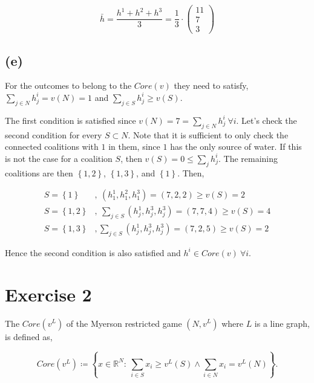\documentclass[american]{scrartcl}
\newcommand{\set}[1]{\left\{#1\right\}}
\newcommand{\Real}{\mathbb{R}}
\begin{document}
\begin{equation}
    \bar{h} = \frac{h^1 + h^2 + h^3}{3} = \frac{1}{3} \cdot \begin{pmatrix}
        11 \\ 7 \\3
    \end{pmatrix}
\end{equation}

\subsection*{(e)}

For the outcomes to belong to the $Core(v)$ they need to satisfy, $\sum_{j \in N} h_j^i = v(N) = 1$ and $\sum_{j \in S}  h_j^i \geq v(S)$.

The first condition is satisfied since $v(N) = 7 = \sum_{j \in N} h_j^i \ \forall i$. Let's check the second condition for every $S \subset N$. Note that it is sufficient to only check the connected coalitions with $1$ in them, since $1$ has the only source of water. If this is not the case for a coalition $S$, then $v(S) = 0 \leq \sum_{j} h_j^i$. The remaining coalitions are then $\set{1, 2}$, $\set{1, 3}$, and $\set{1}$. Then,

\begin{equation}
    \begin{split}
        S = \set{1}&, \ (h^1_1, h^2_1, h^3_1) = (7, 2, 2) \geq v(S) = 2 \\
        S = \set{1, 2}&, \ \sum_{j \in S} (h^1_j, h^3_j, h^3_j) = (7, 7, 4) \geq v(S) = 4 \\
        S = \set{1, 3}&, \sum_{j \in S} (h^1_j, h^3_j, h^3_j) = (7, 2, 5) \geq v(S) = 2
    \end{split}
\end{equation}


Hence the second condition is also satisfied and $h^i \in Core(v) \ \forall i$.

\section*{Exercise 2}

The $Core(v^L)$ of the Myerson restricted game $(N, v^L)$ where $L$ is a line graph, is defined as,

\begin{equation}
    Core(v^L) \coloneqq \set{x \in \Real^N: \ \sum_{i \in S} x_i \geq v^L(S) \land \sum_{i \in N} x_i = v^L(N)}.
\end{equation}
\end{document}
